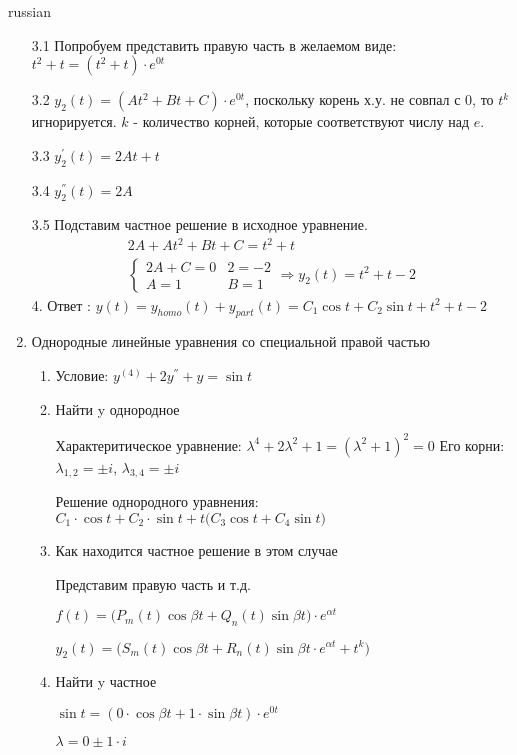 \documentclass{article}
\begin{document}
\begin{otherlanguage*}{russian}
\begin{enumerate}
3.1 Попробуем представить правую часть в желаемом виде: $t^2 + t = (t^2 + t) \cdot e ^ {0t} $

3.2 $ y_2(t) = (A t ^ 2 + Bt + C) \cdot e ^{0t} $, поскольку корень х.у. не совпал с 0, то $t^k$ игнорируется. $ k $ - количество корней, которые соответствуют числу над $e$.  

3.3 $ y ^ {'}_2 (t) = 2 At + t$

3.4 $ y^{''}_2 (t) = 2 A  $

3.5 Подставим частное решение в исходное уравнение. 
\begin{align}
2 A + A t ^ 2 + Bt + C = t ^ 2 + t \\
\begin{cases}
2 A + C = 0 & 2 = - 2 \\
A = 1 & B = 1 
\end{cases} \Rightarrow y_2 (t) = t ^ 2 + t - 2 
\end{align}
4. Ответ : $ y(t) = y_{homo} (t) + y_{part} (t) = C_1 \cos t + C_2 \sin t + t ^ 2 + t - 2 $

\item Однородные линейные уравнения со специальной правой частью 

\begin{enumerate}
\item Условие: $y^{(4)} + 2 y ^{''} + y = \sin t $ 

\item Найти y однородное 

Характеритическое уравнение: $ \lambda ^ 4 + 2 \lambda ^ 2 + 1 = (\lambda ^ 2 + 1) ^ 2 = 0 $
Его корни: $\lambda_{1, 2} = \pm i$, $\lambda_{3, 4} = \pm i$ 

Решение однородного уравнения: $ C_1 \cdot \cos t + C_2 \cdot \sin t + t \big( C_3 \cos t + C_4 \sin t \big)$  

\item Как находится частное решение в этом случае

Представим правую часть и т.д.

$ f(t) = \big( P_m(t) \cos \beta t + Q_n(t) \sin \beta t \big) \cdot e ^{\alpha t} $

$ y_2(t) = \big( S_m (t) \cos \beta t + R_n (t) \sin \beta t \cdot e^{\alpha t} + t^k \big)$

\item Найти y частное

$ \sin t = ( 0 \cdot \cos \beta t + 1 \cdot \sin \beta t) \cdot e ^{0 t}$

$ \lambda = 0 \pm 1 \cdot i $


\end{enumerate}
\end{enumerate}
\end{otherlanguage*}
\end{document}
